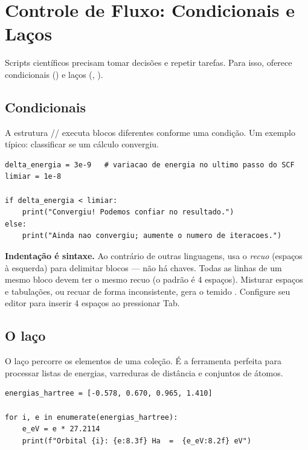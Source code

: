 \section{Controle de Fluxo: Condicionais e Laços}
\label{sec:fluxo}

Scripts científicos precisam tomar decisões e repetir tarefas. Para isso, \python{}
oferece condicionais () e laços (, ).

\subsection{Condicionais}

A estrutura // executa blocos diferentes conforme uma
condição. Um exemplo típico: classificar se um cálculo convergiu.

\begin{lstlisting}[style=python,caption={Decisão condicional.},label={lst:if}]
delta_energia = 3e-9   # variacao de energia no ultimo passo do SCF
limiar = 1e-8

if delta_energia < limiar:
    print("Convergiu! Podemos confiar no resultado.")
else:
    print("Ainda nao convergiu; aumente o numero de iteracoes.")
\end{lstlisting}

\begin{caixaatencao}
\textbf{Indentação é sintaxe.} Ao contrário de outras linguagens, \python{} usa o
\emph{recuo} (espaços à esquerda) para delimitar blocos --- não há chaves. Todas
as linhas de um mesmo bloco devem ter o mesmo recuo (o padrão é 4 espaços).
Misturar espaços e tabulações, ou recuar de forma inconsistente, gera o temido
. Configure seu editor para inserir 4 espaços ao pressionar
Tab.
\end{caixaatencao}

\subsection{O laço }

O laço  percorre os elementos de uma coleção. É a ferramenta perfeita para
processar listas de energias, varreduras de distância e conjuntos de átomos.

\begin{lstlisting}[style=python,caption={Percorrendo energias com \code{for}.},label={lst:for}]
energias_hartree = [-0.578, 0.670, 0.965, 1.410]

for i, e in enumerate(energias_hartree):
    e_eV = e * 27.2114
    print(f"Orbital {i}: {e:8.3f} Ha  =  {e_eV:8.2f} eV")
\end{lstlisting}

